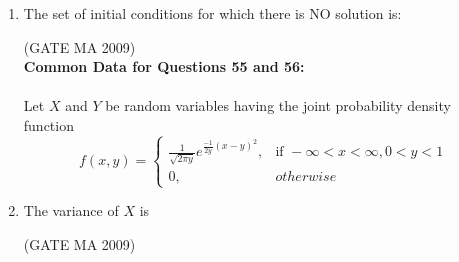 \documentclass[journal,12pt,onecolumn]{IEEEtran}
\theoremstyle{remark}
\begin{document}
\begin{enumerate}[leftmargin=0pt, align=left, start=21]
\item The set of initial conditions for which there is NO solution is:
\begin{enumerate}
\end{enumerate}
\hfill (GATE MA 2009)\\
\textbf{Common Data for Questions 55 and 56:}\\
\\
Let $X$ and $Y$ be random variables having the joint probability density function\\
$$f(x,y)=
\begin{cases}
\frac{1}{\sqrt{2\pi y}}e^{\frac{-1}{2y}(x-y)^2},& \text{if }-\infty<x<\infty,0<y<1\\
0,& otherwise
\end{cases}$$

\item The variance of $X$ is
\begin{enumerate}
\end{enumerate}
\hfill (GATE MA 2009)


\end{enumerate}
\end{document}
